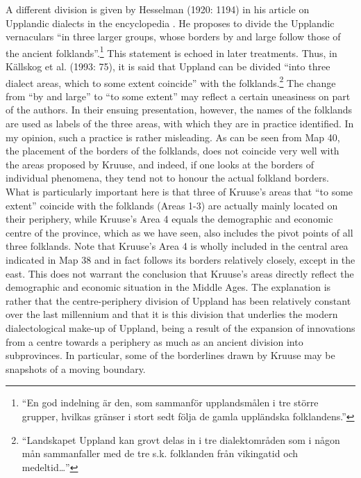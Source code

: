 A different division is given by Hesselman (1920: 1194) in his article on Upplandic dialects in the encyclopedia . He proposes to divide the Upplandic vernaculars “in three larger groups, whose borders by and large follow those of the ancient folklands”.\footnote{ “En god indelning är den, som sammanför upplandsmålen i tre större grupper, hvilkas gränser i stort sedt följa de gamla uppländska folklandens.” } This statement is echoed in later treatments. Thus, in Källskog et al. (1993: 75), it is said that Uppland can be divided “into three dialect areas, which to some extent coincide” with the folklands.\footnote{ “Landskapet Uppland kan grovt delas in i tre dialektområden som i någon mån sammanfaller med de tre s.k. folklanden från vikingatid och medeltid…” } The change from “by and large” to “to some extent” may reflect a certain uneasiness on part of the authors. In their ensuing presentation, however, the names of the folklands are used as labels of the three areas, with which they are in practice identified. In my opinion, such a practice is rather misleading. As can be seen from Map 40, the placement of the borders of the folklands, does not coincide very well with the areas proposed by Kruuse, and indeed, if one looks at the borders of individual phenomena, they tend not to honour the actual folkland borders. What is particularly important here is that three of Kruuse’s areas that “to some extent” coincide with the folklands (Areas 1-3) are actually mainly located on their periphery, while Kruuse’s Area 4 equals the demographic and economic centre of the province, which as we have seen, also includes the pivot points of all three folklands. Note that Kruuse’s Area 4 is wholly included in the central area indicated in Map 38 and in fact follows its borders relatively closely, except in the east. This does not warrant the conclusion that Kruuse’s areas directly reflect the demographic and economic situation in the Middle Ages. The explanation is rather that the centre-periphery division of Uppland has been relatively constant over the last millennium and that it is this division that underlies the modern dialectological make-up of Uppland, being a result of the expansion of innovations from a centre towards a periphery as much as an ancient division into subprovinces. In particular, some of the borderlines drawn by Kruuse may be snapshots of a moving boundary.

